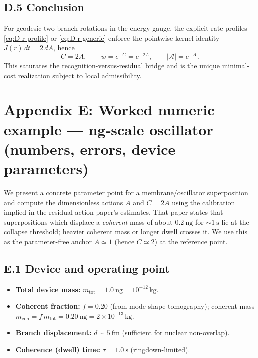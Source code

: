 \documentclass[11pt,letterpaper]{article}
\theoremstyle{definition}
\begin{document}
\subsection*{D.5 Conclusion}

For geodesic two-branch rotations in the energy gauge, the explicit rate profiles \eqref{eq:D-r-profile} or \eqref{eq:D-r-generic} enforce the pointwise kernel identity \(J(r)\,dt=2\,dA\), hence
\[
\boxed{\,C=2A,\qquad w=e^{-C}=e^{-2A},\qquad |\mathcal A|=e^{-A}\,}.
\]
This saturates the recognition-versus-residual bridge and is the unique minimal-cost realization subject to local admissibility.
\medskip

\section*{Appendix E: Worked numeric example — ng‑scale oscillator (numbers, errors, device parameters)}

We present a concrete parameter point for a membrane/oscillator superposition and compute the dimensionless actions \(A\) and \(C=2A\) using the calibration implied in the residual-action paper’s estimates. That paper states that superpositions which displace a \emph{coherent} mass of about \(0.2~\mathrm{ng}\) for \(\sim 1~\mathrm{s}\) lie at the collapse threshold; heavier coherent mass or longer dwell crosses it. We use this as the parameter-free anchor \(A\simeq 1\) (hence \(C\simeq 2\)) at the reference point.
\subsection*{E.1 Device and operating point}

\begin{itemize}
\item \textbf{Total device mass:} \(m_{\mathrm{tot}}=1.0~\mathrm{ng}=10^{-12}\,\mathrm{kg}\).
\item \textbf{Coherent fraction:} \(f=0.20\) (from mode-shape tomography); coherent mass \(m_{\mathrm{coh}}=f\,m_{\mathrm{tot}}=0.20~\mathrm{ng}=2\times 10^{-13}\,\mathrm{kg}\).
\item \textbf{Branch displacement:} \(d\sim 5~\mathrm{fm}\) (sufficient for nuclear non-overlap).
\item \textbf{Coherence (dwell) time:} \(\tau=1.0~\mathrm{s}\) (ringdown-limited).
\end{itemize}
\end{document}
